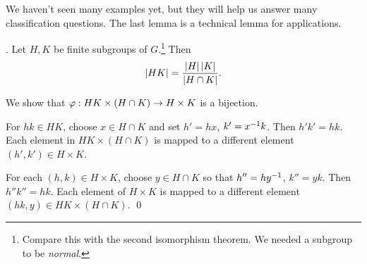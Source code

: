 We haven't seen many examples yet, but they will help us answer many classification questions. The last lemma is a technical lemma for applications.

\lemma. Let \(H, K\) be finite subgroups of \(G\).\footnote{Compare this with the second isomorphism theorem. We needed a subgroup to be \textit{normal}.} Then
\[
    \left| HK \right| = \frac{\left| H \right| \left| K \right|}{\left| H \cap K \right|}.
\]

\pf We show that \(\varphi : HK \times (H \cap K) \rightarrow H \times K\) is a bijection.

\note{\(\geq\)} For \(hk \in HK\), choose \(x \in H \cap K\) and set \(h' = hx\), \(k' = x^{-1} k\). Then \(h'k' = hk\). Each element in \(HK \times (H \cap K)\) is mapped to a different element \((h', k') \in H \times K\).

\note{\(\leq\)} For each \((h, k) \in H \times K\), choose \(y \in H\cap K\) so that \(h'' = hy^{-1}\), \(k'' = yk\). Then \(h''k'' = hk\). Each element of \(H \times K\) is mapped to a different element \((hk, y) \in HK \times (H \cap K)\). \qed
